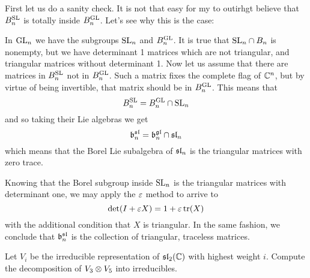 \documentclass[12pt]{memoir}
\begin{document}
\begin{ptcbr}
    First let us do a sanity check. It is not that easy for my to outirhgt believe that $B^{\mathrm{SL}}_n$ is totally inside $B^{\mathrm{GL}}_n$. Let's see why this is the case:\par
    In $\mathrm{GL}_n$ we have the subgroups $\mathrm{SL}_n$ and $B_n^{\mathrm{GL}}$. It is true that $\mathrm{SL}_n\cap B_n$ is nonempty, but we have determinant 1 matrices which are not triangular, and triangular matrices without determinant 1. Now let us assume that there are matrices in $B^{\mathrm{SL}}_n$ not in $B^{\mathrm{GL}}_n$. Such a matrix fixes the complete flag of $\mathbb{C}^n$, but by virtue of being invertible, that matrix should be in $B^{\mathrm{GL}}_n$. This means that 
    $$B^{\mathrm{SL}}_n=B^{\mathrm{GL}}_n\cap\mathrm{SL}_n$$ 
    and so taking their Lie algebras we get 
    $$\mathfrak{b}^{\mathfrak{sl}}_n=\mathfrak{b}^{\mathfrak{gl}}_n\cap\mathfrak{sl}_n$$
    which means that the Borel Lie subalgebra of $\mathfrak{sl}_n$ is the triangular matrices with zero trace.\par
    Knowing that the Borel subgroup inside $\mathrm{SL}_n$ is the triangular matrices with determinant one, we may apply the $\varepsilon$ method to arrive to 
    $$\det(I+\varepsilon X)=1+\varepsilon\tr(X)$$
    with the additional condition that $X$ is triangular. In the same fashion, we conclude that $\mathfrak{b}^{\mathfrak{sl}}_n$ is the collection of triangular, traceless matrices.
\end{ptcbr}

\begin{Ej}
    Let $V_i$ be the irreducible representation of $\mathfrak{sl}_2(\mathbb{C})$ with highest weight $i$. Compute the
decomposition of $V_3\otimes V_5$ into irreducibles.
\end{Ej}
\end{document}
